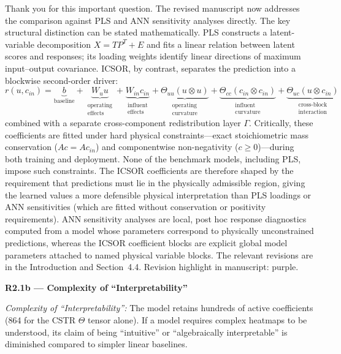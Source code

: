 \documentclass[a4paper,11pt]{article}
\newcommand{\reviewlabel}[1]{\noindent\textbf{\textcolor{accentblue}{#1}}\par\medskip}
\newcommand{\revhighlight}[2]{\textcolor{#1}{Revision highlight in manuscript: #2.}}
\begin{document}
Thank you for this important question. The revised manuscript now addresses the comparison against PLS and ANN sensitivity analyses directly. The key structural distinction can be stated mathematically. PLS constructs a latent-variable decomposition $X = TP^T + E$ and fits a linear relation between latent scores and responses; its loading weights identify linear directions of maximum input--output covariance. ICSOR, by contrast, separates the prediction into a blockwise second-order driver:
\[
r(u, c_{in}) = \underbrace{b}_{\text{baseline}} + \underbrace{W_u u}_{\substack{\text{operating}\\\text{effects}}} + \underbrace{W_{in} c_{in}}_{\substack{\text{influent}\\\text{effects}}} + \underbrace{\Theta_{uu}(u \otimes u)}_{\substack{\text{operating}\\\text{curvature}}} + \underbrace{\Theta_{cc}(c_{in} \otimes c_{in})}_{\substack{\text{influent}\\\text{curvature}}} + \underbrace{\Theta_{uc}(u \otimes c_{in})}_{\substack{\text{cross-block}\\\text{interaction}}}
\]
combined with a separate cross-component redistribution layer $\Gamma$. Critically, these coefficients are fitted under hard physical constraints---exact stoichiometric mass conservation ($Ac = Ac_{in}$) and componentwise non-negativity ($c \ge 0$)---during both training and deployment. None of the benchmark models, including PLS, impose such constraints. The ICSOR coefficients are therefore shaped by the requirement that predictions must lie in the physically admissible region, giving the learned values a more defensible physical interpretation than PLS loadings or ANN sensitivities (which are fitted without conservation or positivity requirements). ANN sensitivity analyses are local, post hoc response diagnostics computed from a model whose parameters correspond to physically unconstrained predictions, whereas the ICSOR coefficient blocks are explicit global model parameters attached to named physical variable blocks. The relevant revisions are in the Introduction and Section~4.4. \revhighlight{revRtwoOne}{purple}

\reviewlabel{R2.1b --- Complexity of ``Interpretability''}
\begin{reviewbox}
\textit{Complexity of ``Interpretability'':} The model retains hundreds of active coefficients (864 for the CSTR $\Theta$ tensor alone). If a model requires complex heatmaps to be understood, its claim of being ``intuitive'' or ``algebraically interpretable'' is diminished compared to simpler linear baselines.
\end{reviewbox}
\end{document}

